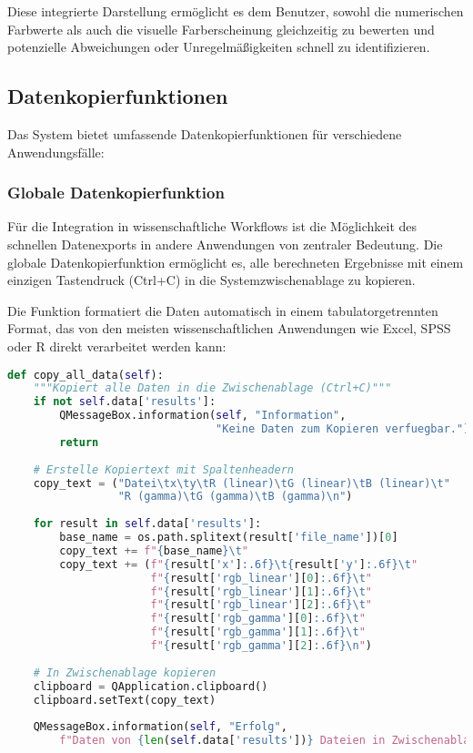 Diese integrierte Darstellung ermöglicht es dem Benutzer, sowohl die numerischen Farbwerte als auch die visuelle Farberscheinung gleichzeitig zu bewerten und potenzielle Abweichungen oder Unregelmäßigkeiten schnell zu identifizieren.

\subsection{Datenkopierfunktionen}

Das System bietet umfassende Datenkopierfunktionen für verschiedene Anwendungsfälle:

\subsubsection{Globale Datenkopierfunktion}

Für die Integration in wissenschaftliche Workflows ist die Möglichkeit des schnellen Datenexports in andere Anwendungen von zentraler Bedeutung. Die globale Datenkopierfunktion ermöglicht es, alle berechneten Ergebnisse mit einem einzigen Tastendruck (Ctrl+C) in die Systemzwischenablage zu kopieren.

Die Funktion formatiert die Daten automatisch in einem tabulatorgetrennten Format, das von den meisten wissenschaftlichen Anwendungen wie Excel, SPSS oder R direkt verarbeitet werden kann:

\begin{lstlisting}[language=Python, caption={Komplette Datenkopierfunktion}, 
    label={lst:copy_all_data}, breaklines=true, breakatwhitespace=true, columns=fullflexible]
def copy_all_data(self):
    """Kopiert alle Daten in die Zwischenablage (Ctrl+C)"""
    if not self.data['results']:
        QMessageBox.information(self, "Information", 
                                "Keine Daten zum Kopieren verfuegbar.")
        return
    
    # Erstelle Kopiertext mit Spaltenheadern
    copy_text = ("Datei\tx\ty\tR (linear)\tG (linear)\tB (linear)\t"
                 "R (gamma)\tG (gamma)\tB (gamma)\n")
    
    for result in self.data['results']:
        base_name = os.path.splitext(result['file_name'])[0]
        copy_text += f"{base_name}\t"
        copy_text += (f"{result['x']:.6f}\t{result['y']:.6f}\t"
                      f"{result['rgb_linear'][0]:.6f}\t"
                      f"{result['rgb_linear'][1]:.6f}\t"
                      f"{result['rgb_linear'][2]:.6f}\t"
                      f"{result['rgb_gamma'][0]:.6f}\t"
                      f"{result['rgb_gamma'][1]:.6f}\t"
                      f"{result['rgb_gamma'][2]:.6f}\n")
    
    # In Zwischenablage kopieren
    clipboard = QApplication.clipboard()
    clipboard.setText(copy_text)
    
    QMessageBox.information(self, "Erfolg", 
        f"Daten von {len(self.data['results'])} Dateien in Zwischenablage kopiert.")
\end{lstlisting}


